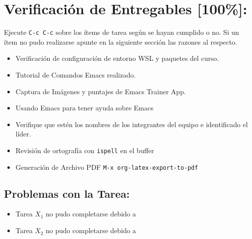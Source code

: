 \documentclass{article}
\begin{document}
\section{Verificación de Entregables [100\%]:}
\label{sec:orgcb7b1cb}
Ejecute \texttt{C-c C-c} sobre los ítems de tarea según se hayan cumplido o
no. Si un ítem no pudo realizarse apunte en la siguiente sección las
razones al respecto.
\begin{itemize}
\item[{$\boxtimes$}] Verificación de configuración de entorno WSL y paquetes del curso.
\item[{$\boxtimes$}] Tutorial de Comandos Emacs realizado.
\item[{$\boxtimes$}] Captura de Imágenes y puntajes de Emacs Trainer App.
\item[{$\boxtimes$}] Usando Emacs para tener ayuda sobre Emacs
\item[{$\boxtimes$}] Verifique que estén los nombres de los integrantes del equipo e
identificado el líder.
\item[{$\boxtimes$}] Revisión de ortografía con \texttt{ispell} en el buffer
\item[{$\boxtimes$}] Generación de Archivo PDF \texttt{M-x org-latex-export-to-pdf}
\end{itemize}
\subsection{Problemas con la Tarea:}
\label{sec:org7d183e8}
\begin{itemize}
\item Tarea \(X_1\) no pudo completarse debido a
\item Tarea \(X_2\) no pudo completarse debido a
\end{itemize}
\end{document}
